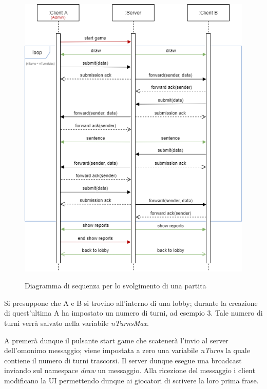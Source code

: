 \begin{figure}[H]
    \caption{Diagramma di sequenza per lo svolgimento di una partita}
    \centering
    \includegraphics[width=400mm]{img/uml/guessr_game_sequence.png}
    \label{fig:guessr_game_sequence}
\end{figure}

\noindent Si presuppone che A e B si trovino all'interno di una lobby; durante la creazione di quest'ultima A ha impostato un numero di turni, ad esempio 3. Tale numero di turni verrà salvato nella variabile \textit{nTurnsMax}.\newline

\noindent A premerà  dunque il pulsante start game che scatenerà l'invio al server dell'omonimo messaggio; viene impostata a zero una variabile \textit{nTurns} la quale contiene il numero di turni trascorsi.\newline
Il server dunque esegue una broadcast inviando sul namespace \textit{draw} un messaggio. Alla ricezione del messaggio i client modificano la UI permettendo dunque ai giocatori di scrivere la loro prima frase.\newline


